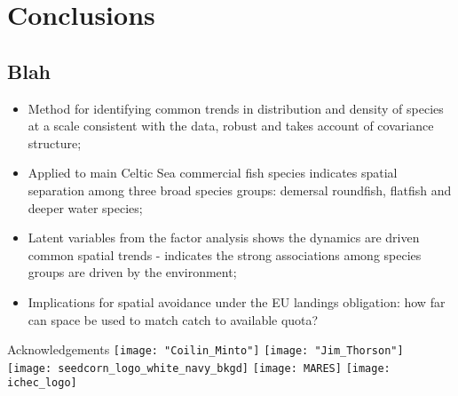 \documentclass[xcolor=x11names,compress]{beamer}
\renewcommand{\(}{\begin{columns}}
\renewcommand{\)}{\end{columns}}
\newcommand{\<}[1]{\begin{column}{#1}}
\renewcommand{\>}{\end{column}}
\begin{document}
\section{Conclusions}
\subsection{Blah}

\begin{frame}
\begin{itemize}
\small	
\setlength\itemsep{1em}
	\item Method for identifying common trends in distribution and density
		of species at a scale consistent with the data, robust and
		takes account of covariance structure;
	\item Applied to main Celtic Sea commercial fish species indicates
		spatial separation among three broad species groups: demersal
		roundfish, flatfish and deeper water species;
	\item Latent variables from the factor analysis shows the dynamics are
		driven common spatial trends - indicates the strong
		associations among species groups are driven by the
		environment; 
	\item Implications for spatial avoidance under the EU landings
		obligation: how far can space be used to match catch to
		available quota?
\end{itemize}

\end{frame}


\begin{frame}{Acknowledgements}
\centering
\texttt{[image: "Coilin\_Minto"]} \hspace{1cm}
\texttt{[image: "Jim\_Thorson"]} \\
\vspace{1cm}
\texttt{[image: seedcorn\_logo\_white\_navy\_bkgd]} 
\hspace{0.5cm}
\texttt{[image: MARES]} 
\hspace{0.5cm}
\texttt{[image: ichec\_logo]} 


\end{frame}
\end{document}
